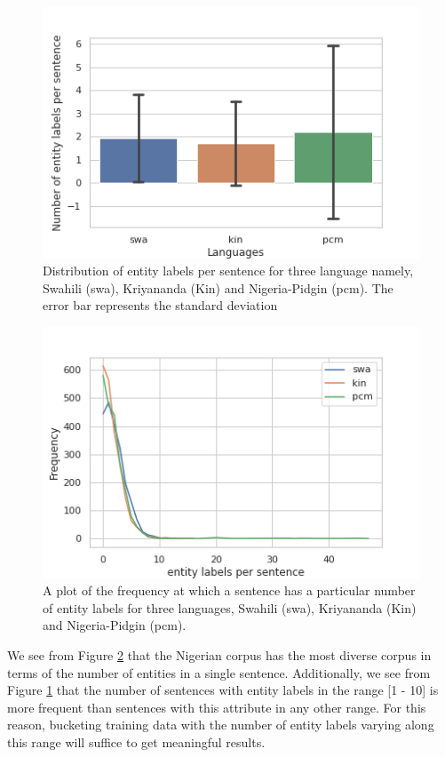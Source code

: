 \documentclass{article}
\begin{document}
\begin{figure}
    \centering
    \includegraphics[width=\columnwidth]{images/dist_plot.png}
    \caption{Distribution of entity labels per sentence for three language namely, Swahili (swa), Kriyananda (Kin) and Nigeria-Pidgin (pcm). The error bar represents the standard deviation}
    \label{fig:dist}
\end{figure}

\begin{figure}
    \centering
    \includegraphics[width=\columnwidth]{images/evlution.png}
    \caption{A plot of the frequency at which a sentence has a particular number of entity labels for three languages, Swahili (swa), Kriyananda (Kin) and Nigeria-Pidgin (pcm).}
    \label{fig:evolution}
\end{figure}

We see from Figure \ref{fig:evolution} that the Nigerian corpus has the most diverse corpus in terms of the number of entities in a single sentence. Additionally, we see from Figure \ref{fig:dist} that the number of sentences with entity labels in the range [1 - 10] is more frequent than sentences with this attribute in any other range. For this reason, bucketing training data with the number of entity labels varying along this range will suffice to get meaningful results.
\end{document}
